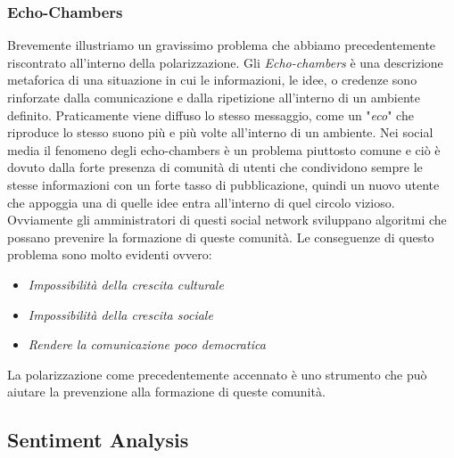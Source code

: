 \subsubsection{Echo-Chambers}
Brevemente illustriamo un gravissimo problema che abbiamo precedentemente riscontrato all'interno della polarizzazione.
Gli \textit{Echo-chambers} è una descrizione metaforica di una situazione in cui le informazioni, le idee, o credenze sono rinforzate dalla comunicazione e dalla ripetizione all'interno di un ambiente definito. Praticamente viene diffuso lo stesso messaggio, come un "\textit{eco}" che riproduce lo stesso suono più e più volte all'interno di un ambiente\cite{echo}. 
Nei social media il fenomeno degli echo-chambers è un problema piuttosto comune e ciò è dovuto dalla forte presenza di comunità di utenti che condividono sempre le stesse informazioni con un forte tasso di pubblicazione, quindi un nuovo utente che appoggia una di quelle idee entra all'interno di quel circolo vizioso. Ovviamente gli amministratori di questi social network sviluppano algoritmi che possano prevenire la formazione di queste comunità.
Le conseguenze di questo problema sono molto evidenti ovvero:
\begin{itemize}
\item \textit{Impossibilità della crescita culturale}
\item \textit{Impossibilità della crescita sociale}
\item \textit{Rendere la comunicazione poco democratica}
\end{itemize}
La polarizzazione come precedentemente accennato è uno strumento che può aiutare la prevenzione alla formazione di queste comunità.

\subsection{Sentiment Analysis}

